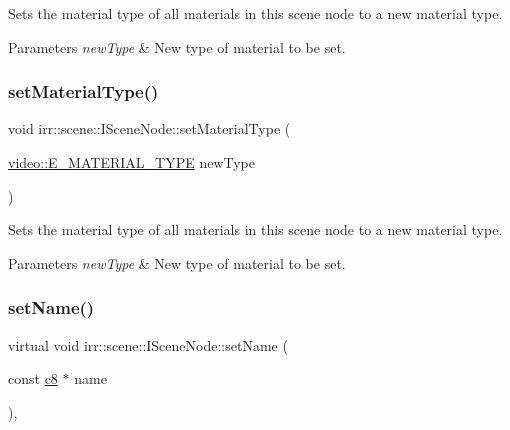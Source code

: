 Sets the material type of all materials in this scene node to a new material type. 


\begin{DoxyParams}{Parameters}
{\em new\+Type} & New type of material to be set. \\
\hline
\end{DoxyParams}
\mbox{\label{classirr_1_1scene_1_1ISceneNode_a302c7dedd776b52111823df5ed8446de}} 
\subsubsection{\texorpdfstring{set\+Material\+Type()}{setMaterialType()}\hspace{0.1cm}{\footnotesize\ttfamily [2/2]}}
{\footnotesize\ttfamily void irr\+::scene\+::\+I\+Scene\+Node\+::set\+Material\+Type (\begin{DoxyParamCaption}\item[{\hyperlink{namespaceirr_1_1video_ac8e9b6c66f7cebabd1a6d30cbc5430f1}{video\+::\+E\+\_\+\+M\+A\+T\+E\+R\+I\+A\+L\+\_\+\+T\+Y\+PE}}]{new\+Type }\end{DoxyParamCaption})\hspace{0.3cm}{\ttfamily [inline]}}



Sets the material type of all materials in this scene node to a new material type. 


\begin{DoxyParams}{Parameters}
{\em new\+Type} & New type of material to be set. \\
\hline
\end{DoxyParams}
\mbox{\label{classirr_1_1scene_1_1ISceneNode_a810a54a2fc178b9a0e731513865f67d0}} 
\subsubsection{\texorpdfstring{set\+Name()}{setName()}\hspace{0.1cm}{\footnotesize\ttfamily [1/4]}}
{\footnotesize\ttfamily virtual void irr\+::scene\+::\+I\+Scene\+Node\+::set\+Name (\begin{DoxyParamCaption}\item[{const \hyperlink{namespaceirr_a9395eaea339bcb546b319e9c96bf7410}{c8} $\ast$}]{name }\end{DoxyParamCaption})\hspace{0.3cm}{\ttfamily [inline]}, {\ttfamily [virtual]}}




